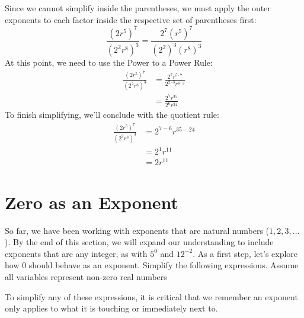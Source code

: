 \documentclass{ximera}
\begin{document}
\begin{example}
\begin{explanation}
\begin{enumerate}
                  Since we cannot simplify inside the parentheses,
                  we must apply the outer exponents to each factor inside the respective set of parentheses first:
                    \begin{equation*}
                    \frac{\left(2r^5\right)^7}{\left(2^2 r^8\right)^3}
                    =  \frac{2^7 \left(r^5\right)^7}{\left(2^2\right)^3 \left(r^8\right)^3} 
                    \end{equation*}
                   At this point, we need to use the Power to a Power Rule:
                    \begin{align*}
                    \frac{\left(2r^5\right)^7}{\left(2^2 r^8\right)^3}
                    &= \frac{2^{7} r^{5\cdot 7}}{ 2^{2\cdot 3} r^{8 \cdot 3}}\\
                    &= \frac{2^{7} r^{35}}{ 2^{6} r^{24}}
                    \end{align*}
%
                   To finish simplifying, we'll conclude with the quotient rule:
%
                    \begin{align*}
                    \frac{\left(2r^5\right)^7}{\left(2^2 r^8\right)^3} &= 2^{7-6} r^{35-24}\\
                    &= 2^{1} r^{11}\\
                    &= 2 r^{11}
                    \end{align*}
\end{enumerate}
\end{explanation}
\end{example}
\section{Zero as an Exponent}
So far, we have been working with exponents that are natural numbers
      ($1, 2, 3, \ldots$).
      By the end of this section,
      we will expand our understanding to include exponents that are any integer,
      as with $5^{0}$ and $12^{-2}$.
      As a first step,
      let's explore how $0$ should behave as an exponent.
 Simplify the following expressions.
              Assume all variables represent non-zero real numbers


To simplify any of these expressions,
              it is critical that we remember an exponent only applies to what it is touching or immediately next to.
\end{document}
